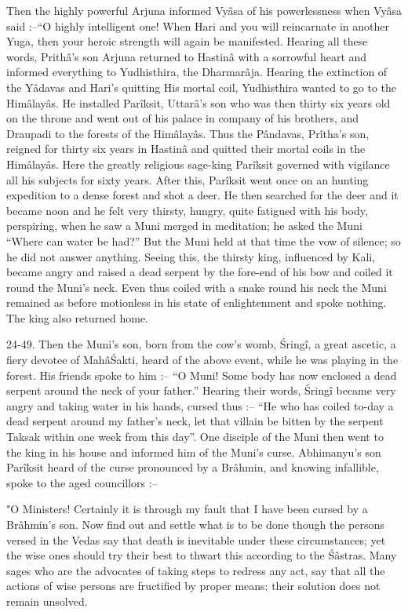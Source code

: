 Then the highly powerful Arjuna informed Vy\^asa of his powerlessness when Vy\^asa said :--``O highly intelligent one! When Hari and you will reincarnate in another Yuga, then your heroic strength will again be manifested. Hearing all these words, Prith\^a's son Arjuna returned to Hastin\^a with a sorrowful heart and informed everything to Yudhisthira, the Dharmar\^aja. Hearing the extinction of the Y\^adavas and Hari's quitting His mortal coil, Yudhisthira wanted to go to the Him\^alay\^as. He installed Par\^iksit, Uttar\^a's son who was then thirty six years old on the throne and went out of his palace in company of his brothers, and Draupadi to the forests of the Him\^alay\^as. Thus the P\^andavas, Pr\^itha's son, reigned for thirty six years in Hastin\^a and quitted their mortal coils in the Him\^alay\^as. Here the greatly religious sage-king Par\^iksit governed with vigilance all his subjects for sixty years. After this, Par\^iksit went once on an hunting expedition to a dense forest and shot a deer. He then searched for the deer and it became noon and he felt very thirsty, hungry, quite fatigued with his body, perspiring, when he saw a Muni merged in meditation; he asked the Muni ``Where can water be had?'' But the Muni held at that time the vow of silence; so he did not answer anything. Seeing this, the thirsty king, influenced by Kali, became angry and raised a dead serpent by the fore-end of his bow and coiled it round the Muni's neck. Even thus coiled with a snake round his neck the Muni remained as before motionless in his state of enlightenment and spoke nothing. The king also returned home.

24-49. Then the Muni's son, born from the cow's womb, \'Sring\^i, a great ascetic, a fiery devotee of Mah\^a\'Sakti, heard of the above event, while he was playing in the forest. His friends spoke to him :-- ``O Muni! Some body has now enclosed a dead serpent around the neck of your father.'' Hearing their words, \'Sring\^i became very angry and taking water in his hands, cursed thus :-- ``He who has coiled to-day a dead serpent around my father's neck, let that villain be bitten by the serpent Taksak within one week from this day''. One disciple of the Muni then went to the king in his house and informed him of the Muni's curse. Abhimanyu's son Par\^iksit heard of the curse pronounced by a Br\^ahmin, and knowing infallible, spoke to the aged councillors :--

"O Ministers! Certainly it is through my fault that I have been cursed by a Br\^ahmin's son. Now find out and settle what is to be done though the persons versed in the Vedas say that death is inevitable under these circumstances; yet the wise ones should try their best to thwart this according to the \'S\^astras. Many sages who are the advocates of taking steps to redress any act, say that all the actions of wise persons are fructified by proper means; their solution does not remain unsolved.

